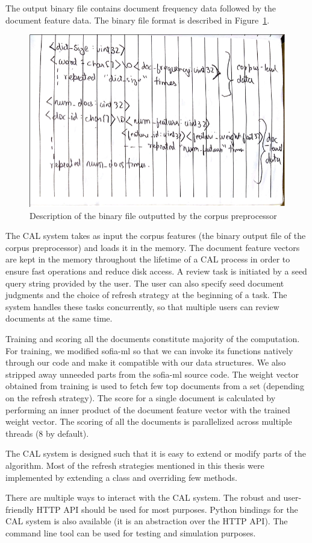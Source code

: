 The output binary file contains document frequency data followed by the document
feature data. The binary file format is described in
Figure~\ref{fig:binary_format}.

\begin{figure}[h]
\includegraphics[width=\textwidth]{tmp_pictures/binary.png}
\caption{Description of the binary file outputted by the corpus preprocessor}
\label{fig:binary_format}
\end{figure}

The CAL system takes as input the corpus features (the binary output file of the
corpus preprocessor) and loads it in the memory. The document feature vectors
are kept in the memory throughout the lifetime of a CAL process in order to
ensure fast operations and reduce disk access. A review task is initiated by a
seed query string provided by the user. The user can also specify seed document
judgments and the choice of refresh strategy at the beginning of a task. The
system handles these tasks concurrently, so that multiple users can review
documents at the same time.

Training and scoring all the documents constitute majority of the computation.
For training, we modified sofia-ml so that we can invoke its functions natively
through our code and make it compatible with our data structures. We also
stripped away unneeded parts from the sofia-ml source code. The weight vector
obtained from training is used to fetch few top documents from a set (depending
on the refresh strategy). The score for a single document is calculated by
performing an inner product of the document feature vector with the trained
weight vector. The scoring of all the documents is parallelized across multiple
threads (8 by default).

The CAL system is designed such that it is easy to extend or modify parts of the
algorithm. Most of the refresh strategies mentioned in this thesis were
implemented by extending a class and overriding few methods.

There are multiple ways to interact with the CAL system. The robust and user-friendly
HTTP API should be used for most purposes. Python bindings for the CAL system is
also available (it is an abstraction over the HTTP API). The command line tool
can be used for testing and simulation purposes.
